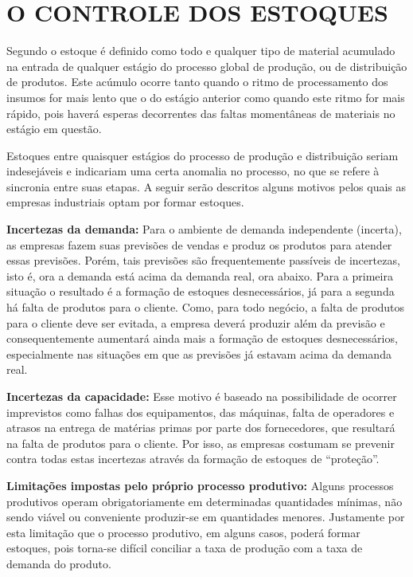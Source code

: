\chapter{O CONTROLE DOS ESTOQUES}
\label{chap:controle_estoques}

Segundo \cite{slack2006administracao} o estoque é definido como todo e qualquer tipo de material acumulado na entrada de qualquer estágio do processo global de produção, ou de distribuição de produtos. Este acúmulo ocorre tanto quando o ritmo de processamento dos insumos for mais lento que o do estágio anterior como quando este ritmo for mais rápido, pois haverá esperas decorrentes das faltas momentâneas de materiais no estágio em questão.

Estoques entre quaisquer estágios do processo de produção e distribuição seriam indesejáveis e indicariam uma certa anomalia no processo, no que se refere à sincronia entre suas etapas. A seguir serão descritos alguns motivos pelos quais as empresas industriais optam por formar estoques.

\textbf{Incertezas da demanda:} Para o ambiente de demanda independente (incerta), as empresas fazem suas previsões de vendas e produz os produtos para atender essas previsões. Porém, tais previsões são frequentemente passíveis de incertezas, isto é, ora a demanda está acima da demanda real, ora abaixo. Para a primeira situação o resultado é a formação de estoques desnecessários, já para a segunda há falta de produtos para o cliente. Como, para todo negócio, a falta de produtos para o cliente deve ser evitada, a empresa deverá produzir além da previsão e consequentemente aumentará ainda mais a formação de estoques desnecessários, especialmente nas situações em que as previsões já estavam acima da demanda real.

\textbf{Incertezas da capacidade:} Esse motivo é baseado na possibilidade de ocorrer imprevistos como falhas dos equipamentos, das máquinas, falta de operadores e atrasos na entrega de matérias primas por parte dos fornecedores, que resultará na falta de produtos para o cliente. Por isso, as empresas costumam se prevenir contra todas estas incertezas através da formação de estoques de ``proteção''.

\textbf{Limitações impostas pelo próprio processo produtivo:} Alguns processos produtivos operam obrigatoriamente em determinadas quantidades mínimas, não sendo viável ou conveniente produzir-se em quantidades menores. Justamente por esta limitação que o processo produtivo, em alguns casos, poderá formar estoques, pois torna-se difícil conciliar a taxa de produção com a taxa de demanda do produto.

